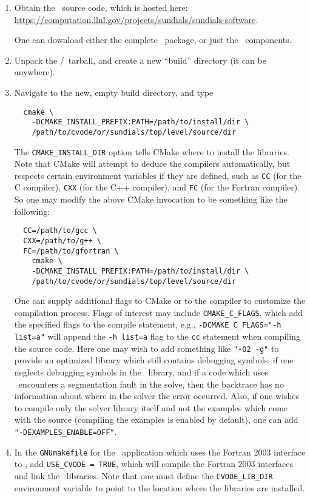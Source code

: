 \begin{enumerate}

  \item Obtain the \cvode\ source code, which is hosted here: \url{https://computation.llnl.gov/projects/sundials/sundials-software}.

  One can download either the complete \sundials\ package, or just the \cvode\ components.

  \item Unpack the \cvode/\sundials\ tarball, and create a new ``build'' directory (it can be anywhere).

  \item Navigate to the new, empty build directory, and type

  \begin{verbatim}
  cmake \
    -DCMAKE_INSTALL_PREFIX:PATH=/path/to/install/dir \
    /path/to/cvode/or/sundials/top/level/source/dir
  \end{verbatim}

  The \texttt{CMAKE\_INSTALL\_DIR} option tells CMake where to install the libraries.
  Note that CMake will attempt to deduce the compilers automatically, but respects certain environment variables if they are defined, such as \texttt{CC} (for the C compiler), \texttt{CXX} (for the C++ compiler), and \texttt{FC} (for the Fortran compiler).
  So one may modify the above CMake invocation to be something like the following:

  \begin{verbatim}
  CC=/path/to/gcc \
  CXX=/path/to/g++ \
  FC=/path/to/gfortran \
    cmake \
    -DCMAKE_INSTALL_PREFIX:PATH=/path/to/install/dir \
    /path/to/cvode/or/sundials/top/level/source/dir
  \end{verbatim}

  One can supply additional flags to CMake or to the compiler to customize the compilation process. Flags of interest may include \texttt{CMAKE\_C\_FLAGS}, which add the specified flags to the compile statement, e.g.,
  \texttt{-DCMAKE\_C\_FLAGS="-h list=a"} will append the \texttt{-h list=a} flag to the \texttt{cc} statement when compiling the source code.
  Here one may wish to add something like \texttt{"-O2 -g"} to provide an optimized library which still contains debugging symbols; if one neglects debugging symbols in the \cvode\ library, and if a code which uses \cvode\ encounters a segmentation fault in the solve, then the backtrace has no information about where in the solver the error occurred.
  Also, if one wishes to compile only the solver library itself and not the examples which come with the source (compiling the examples is enabled by default), one can add \texttt{"-DEXAMPLES\_ENABLE=OFF"}.

  \item In the \texttt{GNUmakefile} for the \amrex\ application which uses the Fortran 2003 interface to \cvode, add \texttt{USE\_CVODE = TRUE}, which will compile the Fortran 2003 interfaces and link the \cvode\ libraries.
  Note that one must define the \texttt{CVODE\_LIB\_DIR} environment variable to point to the location where the libraries are installed.
\end{enumerate}


